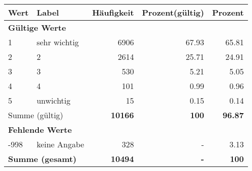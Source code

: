      \begin{longtable}{lXrrr}
     \toprule
     \textbf{Wert} & \textbf{Label} & \textbf{Häufigkeit} & \textbf{Prozent(gültig)} & \textbf{Prozent} \\
     \endhead
     \midrule
     \multicolumn{5}{l}{\textbf{Gültige Werte}}\\

     1 &
     \multicolumn{1}{X}{ sehr wichtig   } &


       \num{6906} &
       \num[round-mode=places,round-precision=2]{67,93} &
         \num[round-mode=places,round-precision=2]{65,81} \\

     2 &
     \multicolumn{1}{X}{ 2   } &


       \num{2614} &
       \num[round-mode=places,round-precision=2]{25,71} &
         \num[round-mode=places,round-precision=2]{24,91} \\

     3 &
     \multicolumn{1}{X}{ 3   } &


       \num{530} &
       \num[round-mode=places,round-precision=2]{5,21} &
         \num[round-mode=places,round-precision=2]{5,05} \\

     4 &
     \multicolumn{1}{X}{ 4   } &


       \num{101} &
       \num[round-mode=places,round-precision=2]{0,99} &
         \num[round-mode=places,round-precision=2]{0,96} \\

     5 &
     \multicolumn{1}{X}{ unwichtig   } &


       \num{15} &
       \num[round-mode=places,round-precision=2]{0,15} &
         \num[round-mode=places,round-precision=2]{0,14} \\
     \midrule
     \multicolumn{2}{l}{Summe (gültig)} &
       \textbf{\num{10166}} &
     \textbf{100} &
       \textbf{\num[round-mode=places,round-precision=2]{96,87}} \\
     \multicolumn{5}{l}{\textbf{Fehlende Werte}}\\
       -998 &
       keine Angabe &
         \num{328} &
        - &
         \num[round-mode=places,round-precision=2]{3,13} \\
     \midrule
     \multicolumn{2}{l}{\textbf{Summe (gesamt)}} &
          \textbf{\num{10494}} &
        \textbf{-} &
        \textbf{100} \\
     \bottomrule
     \end{longtable}
     
